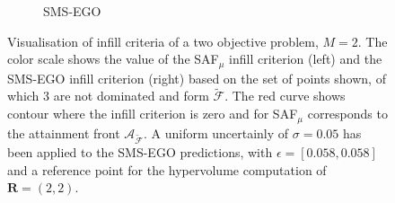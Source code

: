 \documentclass[conference]{IEEEtran}
\newcommand{\attainmentfront}{\mathcal{A}}
\newcommand{\nobj}{M}
\newcommand{\rp}{\mathbf{R}}
\newcommand\safmu{SAF$_{\mu}$\xspace}
\newcommand\smsego{SMS-EGO\xspace}
\newcommand\Fapprox{\tilde{\mathcal{F}}}
\begin{document}
\begin{figure}[t]
\begin{subfigure}[t]{0.48\columnwidth}
    \caption{\smsego}
    \label{fig: smsego_obj_space}
\end{subfigure}
\caption{
    Visualisation of infill criteria of a two objective problem,
    $\nobj=2$. The color scale shows the value of the \safmu infill criterion (left)
    and the \smsego infill criterion (right) based on the set of points
    shown, of which 3 are not dominated and form $\Fapprox$. The red curve shows contour where the
    infill criterion is zero and for \safmu corresponds to the attainment front
    $\attainmentfront_{\Fapprox}$. 
 A uniform uncertainly of $\sigma=0.05$ has been applied to the \smsego predictions, with $\epsilon=[0.058, 0.058]$ and a reference point for the hypervolume computation of $\rp=(2, 2)$.
 }
\label{fig: obj_space_comp}
\end{figure}
\end{document}
